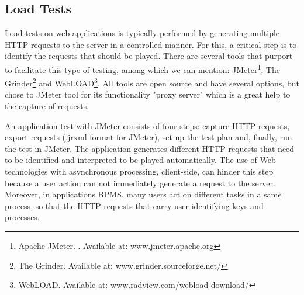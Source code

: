\documentclass[runningheads,a4paper]{llncs}
\begin{document}
{\subsection{Load Tests}

Load tests on web applications is typically performed by generating multiple HTTP requests to the server in a controlled manner. For this, a critical step is to identify the requests that should be played. There are several tools that purport to facilitate this type of testing, among which we can mention: JMeter\footnote{Apache JMeter. . Available at: www.jmeter.apache.org}, The Grinder\footnote{The Grinder. Available at: www.grinder.sourceforge.net/} and WebLOAD\footnote{WebLOAD. Available at: www.radview.com/webload-download/}. All tools are open source and have several options, but chose to JMeter tool for its functionality "proxy server" which is a great help to the capture of requests.

An application test with JMeter consists of four steps: capture HTTP requests, export requests (.jrxml format for JMeter), set up the test plan and, finally, run the test in JMeter. The application generates different HTTP requests that need to be identified and interpreted to be played automatically. The use of Web technologies with asynchronous processing, client-side, can hinder this step because a user action can not immediately generate a request to the server. Moreover, in applications BPMS, many users act on different tasks in a same process, so that the HTTP requests that carry user identifying keys and processes.


}
\end{document}

